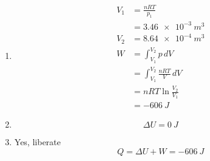\documentclass{article}
\begin{document}
\begin{enumerate}
  \item

        \begin{align*}
          V_1 & = \frac{n R T}{p_1}                      \\
              & = \qty{3.46e-3}{m^3}                     \\
          V_2 & = \qty{8.64e-4}{m^3}                     \\
          W   & = \int_{V_1}^{V_2} p \,d V               \\
              & = \int_{V_1}^{V_2} \frac{n R T}{V} \,d V \\
              & = n R T \ln \frac{V_2}{V_1}              \\
              & = \qty{-606}{J}
        \end{align*}

  \item \[\Delta U = \qty{0}{J}\]

  \item Yes, liberate \[Q = \Delta U + W = \qty{-606}{J}\]
\end{enumerate}

\setcounter{subsubsection}{26}
\subsubsection{}
\end{document}
